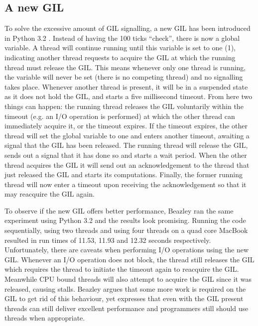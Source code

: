 \subsection{A new GIL}

To solve the excessive amount of GIL signalling, a new GIL has been introduced in Python 3.2 \cite{beazley2010understanding}.
Instead of having the 100 ticks \enquote{check}, there is now a global variable.
A thread will continue running until this variable is set to one (1), indicating another thread requests to acquire the GIL at which the running thread must release the GIL.
This means whenever only one thread is running, the variable will never be set (there is no competing thread) and no signalling takes place.
Whenever another thread is present, it will be in a suspended state as it does not hold the GIL, and starts a five millisecond timeout.
From here two things can happen: the running thread releases the GIL voluntarily within the timeout (e.g. an I/O operation is performed) at which the other thread can immediately acquire it, or the timeout expires.
If the timeout expires, the other thread will set the global variable to one and enters another timeout, awaiting a signal that the GIL has been released.
The running thread will release the GIL, sends out a signal that it has done so and starts a wait period.
When the other thread acquires the GIL it will send out an acknowledgement to the thread that just released the GIL and starts its computations.
Finally, the former running thread will now enter a timeout upon receiving the acknowledgement so that it may reacquire the GIL again.

To observe if the new GIL offers better performance, Beazley ran the same experiment using Python 3.2 and the results look promising.
Running the code sequentially, using two threads and using four threads on a quad core MacBook resulted in run times of 11.53, 11.93 and 12.32 seconds respectively.
Unfortunately, there are caveats when performing I/O operations using the new GIL.
Whenever an I/O operation does not block, the thread still releases the GIL which requires the thread to initiate the timeout again to reacquire the GIL.
Meanwhile CPU bound threads will also attempt to acquire the GIL since it was released, causing stalls.
Beazley argues that some more work is required on the GIL to get rid of this behaviour, yet expresses that even with the GIL present threads can still deliver excellent performance and programmers still should use threads when appropriate.

